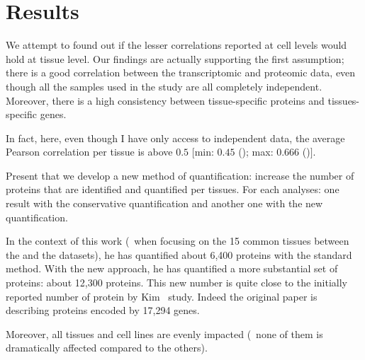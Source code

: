 \section{Results}\label{sec:IntegrationResults}

We attempt to found out if the lesser correlations reported at cell levels would
hold at tissue level.
Our findings are actually supporting the first assumption; there is a good correlation
between the transcriptomic and proteomic data, even though all the samples used in
the study are all completely independent. Moreover, there is a high consistency
between tissue-specific proteins and tissues-specific genes.

In fact, here, even though I have only access to independent data,
the average Pearson correlation per tissue is above $0.5$
$[$min: $0.45$ (\Oesophagus); max: $0.666$ (\Liver)$]$.




Present that we develop a new method of quantification:
increase the number of proteins that are identified and quantified per tissues.
For each analyses: one result with the conservative quantification
and another one with the new quantification.



In the context of this work (\ie\ when focusing on the 15 common tissues between
the  and the  datasets),
he has quantified about 6,400 proteins with
the standard method. With the new approach, he has quantified a more substantial set of
proteins: about 12,300 proteins. This new number is quite close to the initially
reported number of protein by Kim \etal\ study.
Indeed the original paper is describing proteins encoded by 17,294 genes.

Moreover, all tissues and cell lines are evenly impacted
(\ie\ none of them is dramatically affected compared to the others).


